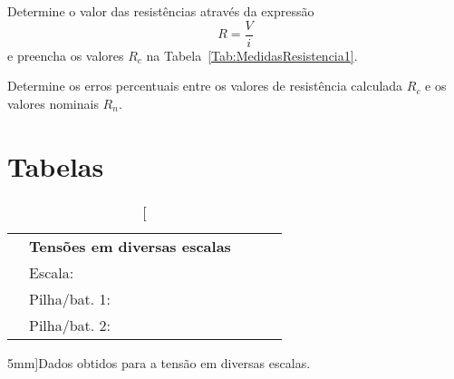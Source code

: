 \begin{question}[type={exam}]{2.5}
Determine o valor das resistências através da expressão
\begin{equation}
    R = \frac{V}{i}
\end{equation}
%
e preencha os valores $R_c$ na Tabela~\ref{Tab:MedidasResistencia1}.
\end{question}

\begin{question}[type={exam}]{2.5}
Determine os erros percentuais entre os valores de resistência calculada $R_c$ e os valores nominais $R_n$. 
\end{question}

\vfill
\pagebreak
\section{Tabelas}

\begin{table*}[!ht]
\centering
\begin{tabular}{lp{20mm}p{20mm}p{20mm}p{20mm}p{20mm}p{20mm}p{20mm}l}
\toprule
    & \multicolumn{5}{l}{\textbf{Tensões em diversas escalas}} \\
    \cmidrule{2-8}
    & Escala: \cellcolor[gray]{0.89} & \cellcolor[gray]{0.92} & \cellcolor[gray]{0.89} & \cellcolor[gray]{0.92} & \cellcolor[gray]{0.89} & \cellcolor[gray]{0.92} & \cellcolor[gray]{0.89} & \\
    & Pilha/bat. 1: \cellcolor[gray]{0.95} & \cellcolor[gray]{0.97} & \cellcolor[gray]{0.95} & \cellcolor[gray]{0.97} & \cellcolor[gray]{0.95} & \cellcolor[gray]{0.97} &  \cellcolor[gray]{0.95} \\
    & Pilha/bat. 2: \cellcolor[gray]{0.89} & \cellcolor[gray]{0.92} & \cellcolor[gray]{0.89} & \cellcolor[gray]{0.92} & \cellcolor[gray]{0.89} & \cellcolor[gray]{0.92} & \cellcolor[gray]{0.89} \\
\bottomrule
\end{tabular}
\caption[][5mm]{Dados obtidos para a tensão em diversas escalas.}
\label{Tab:TensaoPilha}
\end{table*}

\vspace{3cm}

